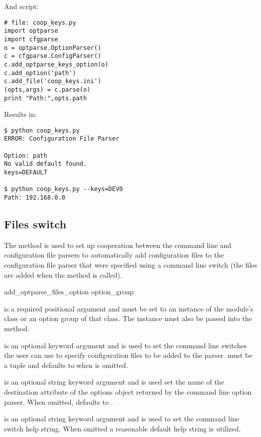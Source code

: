 \documentclass{howto}
\begin{document}
And script:

\begin{verbatim}
# file: coop_keys.py
import optparse
import cfgparse
o = optparse.OptionParser()
c = cfgparse.ConfigParser()
c.add_optparse_keys_option(o)
c.add_option('path')
c.add_file('coop_keys.ini')
(opts,args) = c.parse(o)
print "Path:",opts.path
\end{verbatim}

Results in:

\begin{verbatim}
$ python coop_keys.py
ERROR: Configuration File Parser

Option: path
No valid default found.
keys=DEFAULT

$ python coop_keys.py --keys=DEV0
Path: 192.168.0.0
\end{verbatim}

\subsection{Files switch\label{cfgparse-coop-files}}
        
The 
method is used to set up cooperation between the command line and 
configuration file parsers to automatically add configuration files
to the configuration file parser that were specified using a command
line switch (the files are added when the  method is called).

  \begin{funcdesc}{add_optparse_files_option}{
          option_group
          }

     is a required positional argument and must be set to 
        an instance of the  module's  
        class or an option group of that class.  The  
        instance must also be passed into the  method.
        
     is an optional keyword argument and is used to set
        the command line switches the user can use to specify configuration 
        files to be added to the parser.   must be a tuple and 
        defaults to  when  is omitted.
        
     is an optional string keyword argument and is used set the 
        name of the destination attribute of the options object returned
        by the command line option parser.  When omitted,  defaults
        to .
        
     is an optional string keyword argument and is used to set
        the command line switch help string.  When omitted a reasonable 
        default help string is utilized.
  
  \end{funcdesc}
\end{document}
